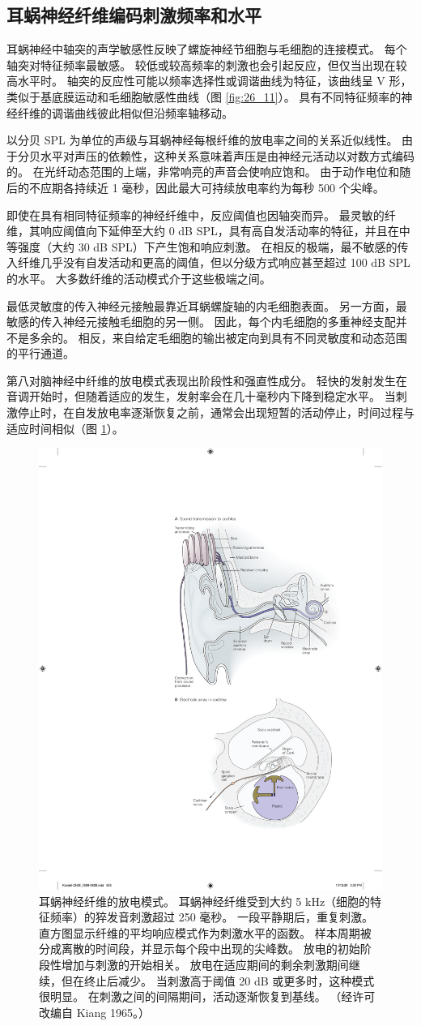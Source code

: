 \subsection{耳蜗神经纤维编码刺激频率和水平}
耳蜗神经中轴突的声学敏感性反映了螺旋神经节细胞与毛细胞的连接模式。 每个轴突对特征频率最敏感。 较低或较高频率的刺激也会引起反应，但仅当出现在较高水平时。 轴突的反应性可能以频率选择性或调谐曲线为特征，该曲线呈 V 形，类似于基底膜运动和毛细胞敏感性曲线（图 \ref{fig:26_11}）。 具有不同特征频率的神经纤维的调谐曲线彼此相似但沿频率轴移动。

以分贝 SPL 为单位的声级与耳蜗神经每根纤维的放电率之间的关系近似线性。 由于分贝水平对声压的依赖性，这种关系意味着声压是由神经元活动以对数方式编码的。 在光纤动态范围的上端，非常响亮的声音会使响应饱和。 由于动作电位和随后的不应期各持续近 1 毫秒，因此最大可持续放电率约为每秒 500 个尖峰。

即使在具有相同特征频率的神经纤维中，反应阈值也因轴突而异。 最灵敏的纤维，其响应阈值向下延伸至大约 0 dB SPL，具有高自发活动率的特征，并且在中等强度（大约 30 dB SPL）下产生饱和响应刺激。 在相反的极端，最不敏感的传入纤维几乎没有自发活动和更高的阈值，但以分级方式响应甚至超过 100 dB SPL 的水平。 大多数纤维的活动模式介于这些极端之间。

最低灵敏度的传入神经元接触最靠近耳蜗螺旋轴的内毛细胞表面。 另一方面，最敏感的传入神经元接触毛细胞的另一侧。 因此，每个内毛细胞的多重神经支配并不是多余的。 相反，来自给定毛细胞的输出被定向到具有不同灵敏度和动态范围的平行通道。

第八对脑神经中纤维的放电模式表现出阶段性和强直性成分。 轻快的发射发生在音调开始时，但随着适应的发生，发射率会在几十毫秒内下降到稳定水平。 
当刺激停止时，在自发放电率逐渐恢复之前，通常会出现短暂的活动停止，时间过程与适应时间相似（图 \ref{fig:26_18}）。


\begin{figure}[htbp]
	\centering
	\includegraphics[width=0.5\linewidth]{chap26/fig_26_18}
	\caption{耳蜗神经纤维的放电模式。 耳蜗神经纤维受到大约 5 kHz（细胞的特征频率）的猝发音刺激超过 250 毫秒。 一段平静期后，重复刺激。 直方图显示纤维的平均响应模式作为刺激水平的函数。 样本周期被分成离散的时间段，并显示每个段中出现的尖峰数。 放电的初始阶段性增加与刺激的开始相关。 放电在适应期间的剩余刺激期间继续，但在终止后减少。 当刺激高于阈值 20 dB 或更多时，这种模式很明显。 在刺激之间的间隔期间，活动逐渐恢复到基线。 （经许可改编自 Kiang 1965。）}
	\label{fig:26_18}
\end{figure}


